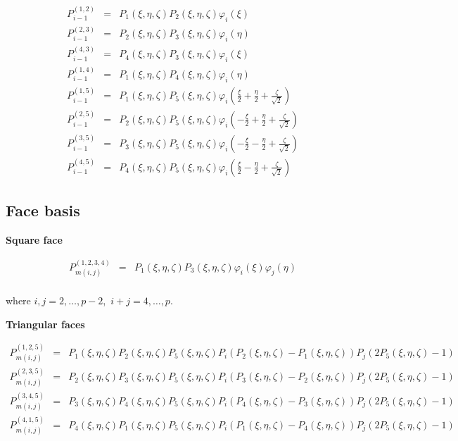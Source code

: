 \begin{eqnarray*}
P_{i-1}^{(1,2)}&=&P_1(\xi,\eta,\zeta)P_2(\xi,\eta,\zeta)\varphi_i(\xi) \\
P_{i-1}^{(2,3)}&=&P_2(\xi,\eta,\zeta)P_3(\xi,\eta,\zeta)\varphi_i(\eta) \\ 
P_{i-1}^{(4,3)}&=&P_4(\xi,\eta,\zeta)P_3(\xi,\eta,\zeta)\varphi_i(\xi) \\
P_{i-1}^{(1,4)}&=&P_1(\xi,\eta,\zeta)P_4(\xi,\eta,\zeta)\varphi_i(\eta) \\
P_{i-1}^{(1,5)}&=&P_1(\xi,\eta,\zeta)P_5(\xi,\eta,\zeta)
\varphi_i(\frac{\xi}{2}+\frac{\eta}{2}+\frac{\zeta}{\sqrt{2}}) \\
P_{i-1}^{(2,5)}&=&P_2(\xi,\eta,\zeta)P_5(\xi,\eta,\zeta) 
\varphi_i(-\frac{\xi}{2}+\frac{\eta}{2}+\frac{\zeta}{\sqrt{2}}) \\
P_{i-1}^{(3,5)}&=&P_3(\xi,\eta,\zeta)P_5(\xi,\eta,\zeta)
\varphi_i(-\frac{\xi}{2}-\frac{\eta}{2}+\frac{\zeta}{\sqrt{2}}) \\
P_{i-1}^{(4,5)}&=&P_4(\xi,\eta,\zeta)P_5(\xi,\eta,\zeta)
\varphi_i(\frac{\xi}{2}-\frac{\eta}{2}+\frac{\zeta}{\sqrt{2}})
\end{eqnarray*}

\subsection{Face basis}

\noindent \textbf{Square face}

\begin{eqnarray*} 
P_{m(i,j)}^{(1,2,3,4)}&=&P_1(\xi,\eta,\zeta)P_3(\xi,\eta,\zeta)
\varphi_i(\xi)\varphi_j(\eta) \\ 
\end{eqnarray*}

\noindent where $i,j=2,\ldots,p-2$,\ $i+j=4,\ldots,p$. 

\noindent \textbf{Triangular faces}

\begin{eqnarray*}
P_{m(i,j)}^{(1,2,5)}&=&P_1(\xi,\eta,\zeta)P_2(\xi,\eta,\zeta)
P_5(\xi,\eta,\zeta)
P_i(P_2(\xi,\eta,\zeta)-P_1(\xi,\eta,\zeta))
P_j(2P_5(\xi,\eta,\zeta)-1) \\
P_{m(i,j)}^{(2,3,5)}&=&P_2(\xi,\eta,\zeta)P_3(\xi,\eta,\zeta)
P_5(\xi,\eta,\zeta)
P_i(P_3(\xi,\eta,\zeta)-P_2(\xi,\eta,\zeta))
P_j(2P_5(\xi,\eta,\zeta)-1) \\
P_{m(i,j)}^{(3,4,5)}&=&P_3(\xi,\eta,\zeta)P_4(\xi,\eta,\zeta)
P_5(\xi,\eta,\zeta)
P_i(P_4(\xi,\eta,\zeta)-P_3(\xi,\eta,\zeta))
P_j(2P_5(\xi,\eta,\zeta)-1) \\
P_{m(i,j)}^{(4,1,5)}&=&P_4(\xi,\eta,\zeta)P_1(\xi,\eta,\zeta)
P_5(\xi,\eta,\zeta)
P_i(P_1(\xi,\eta,\zeta)-P_4(\xi,\eta,\zeta))
P_j(2P_5(\xi,\eta,\zeta)-1)
\end{eqnarray*}

